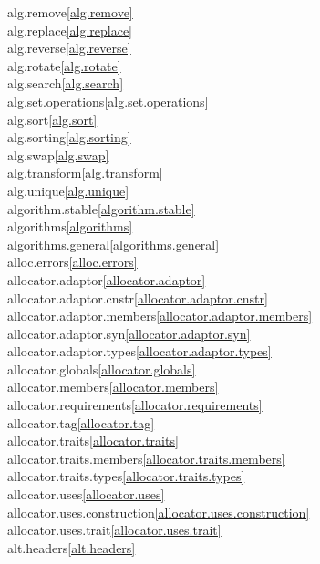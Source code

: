 \begin{multicols}{2}
alg.remove\quad\ref{alg.remove}\\
alg.replace\quad\ref{alg.replace}\\
alg.reverse\quad\ref{alg.reverse}\\
alg.rotate\quad\ref{alg.rotate}\\
alg.search\quad\ref{alg.search}\\
alg.set.operations\quad\ref{alg.set.operations}\\
alg.sort\quad\ref{alg.sort}\\
alg.sorting\quad\ref{alg.sorting}\\
alg.swap\quad\ref{alg.swap}\\
alg.transform\quad\ref{alg.transform}\\
alg.unique\quad\ref{alg.unique}\\
algorithm.stable\quad\ref{algorithm.stable}\\
algorithms\quad\ref{algorithms}\\
algorithms.general\quad\ref{algorithms.general}\\
alloc.errors\quad\ref{alloc.errors}\\
allocator.adaptor\quad\ref{allocator.adaptor}\\
allocator.adaptor.cnstr\quad\ref{allocator.adaptor.cnstr}\\
allocator.adaptor.members\quad\ref{allocator.adaptor.members}\\
allocator.adaptor.syn\quad\ref{allocator.adaptor.syn}\\
allocator.adaptor.types\quad\ref{allocator.adaptor.types}\\
allocator.globals\quad\ref{allocator.globals}\\
allocator.members\quad\ref{allocator.members}\\
allocator.requirements\quad\ref{allocator.requirements}\\
allocator.tag\quad\ref{allocator.tag}\\
allocator.traits\quad\ref{allocator.traits}\\
allocator.traits.members\quad\ref{allocator.traits.members}\\
allocator.traits.types\quad\ref{allocator.traits.types}\\
allocator.uses\quad\ref{allocator.uses}\\
allocator.uses.construction\quad\ref{allocator.uses.construction}\\
allocator.uses.trait\quad\ref{allocator.uses.trait}\\
alt.headers\quad\ref{alt.headers}\\

\end{multicols}
